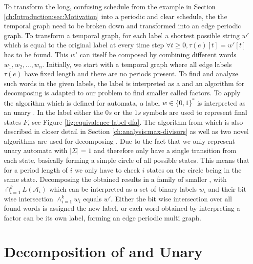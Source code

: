 To transform the long, confusing schedule from the example in Section \ref{ch:Introduction:sec:Motivation} into a periodic and clear schedule, the the temporal graph need to be broken down and transformed into an edge periodic graph. To transform a temporal graph, for each label a shortest possible string $w'$ which is equal to the original label at every time step $\forall t \geq 0, \tau(e)[t] = w'[t]$ has to be found. This $w'$ can itself be composed by combining different words $w_1,w_2,\dots,w_n$. Initially, we start with a temporal graph where all edge labels $\tau(e)$ have fixed length and there are no periods present. To find and analyze such words in the given labels, the label is interpreted as a \DFA and an algorithm for decomposing \DFAs is adapted to our problem to find smaller \DFAs called factors. To apply the algorithm which is defined for automata, a label $ w \in \{0,1\}^*$ is interpreted as an unary \DFA. In the label either the $0s$ or the $1s$ symbols are used to represent final states $F$, see Figure \ref{fig:equivalence-label-dfa}. The algorithm from \cite{DBLP:journals/corr/abs-2107-04683} which is also described in closer detail in Section \ref{ch:analysis:max-divisors} as well as two novel algorithms are used for decomposing \DFAs. Due to the fact that we only represent unary automata with \textbf{$|\Sigma| = 1$} and therefore only have a single transition from each state, basically forming a simple circle of all possible states. This means that for a period length of $i$ we only have to check $i$ states on the circle being in the same state. Decomposing the obtained \DFA results in a family of smaller \DFAs, with $\cap^k_{i=1} L(\mathcal{A}_i)$ which can be interpreted as a set of binary labels $w_i$ and their bit wise intersection $\land^k_{i=1} w_i$ equals $w'$. Either the bit wise intersection over all found words is assigned the new label, or each word obtained by interpreting a factor can be its own label, forming an edge periodic multi graph. 

\section{Decomposition of \DFAs and Unary \DFAs}
\label{ch:analysis:decomposition-unary-dfas}

